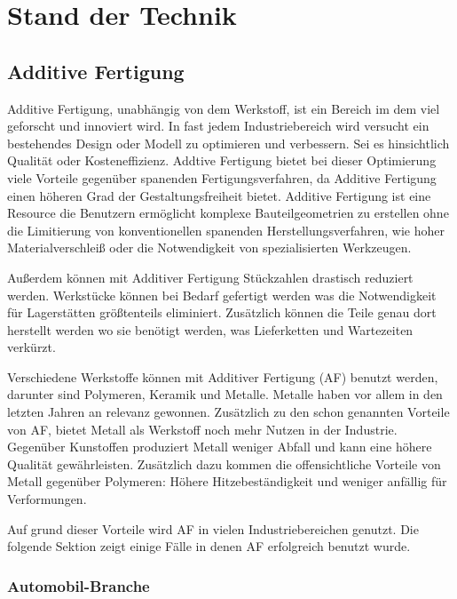 \documentclass[../main.tex]{subfiles}
\begin{document}
\section{Stand der Technik}

\subsection{Additive Fertigung}

Additive Fertigung, unabhängig von dem Werkstoff, ist ein Bereich im dem viel
geforscht und innoviert wird. In fast jedem Industriebereich wird versucht ein
bestehendes Design oder Modell zu optimieren und verbessern. \cite{newMethod}
Sei es hinsichtlich Qualität oder Kosteneffizienz. Addtive Fertigung bietet bei 
dieser Optimierung viele Vorteile gegenüber spanenden Fertigungsverfahren, da 
Additive Fertigung einen höheren Grad der Gestaltungsfreiheit bietet. 
Additive Fertigung ist eine Resource die Benutzern ermöglicht komplexe 
Bauteilgeometrien zu erstellen ohne die Limitierung von konventionellen spanenden 
Herstellungsverfahren, wie hoher Materialverschleiß oder die Notwendigkeit von 
spezialisierten Werkzeugen. \cite{Vafadar.2021} 

Außerdem können mit Additiver Fertigung Stückzahlen drastisch reduziert werden.
Werkstücke können bei Bedarf gefertigt werden was die Notwendigkeit für Lagerstätten
größtenteils eliminiert. Zusätzlich können die Teile genau dort herstellt werden wo 
sie benötigt werden, was Lieferketten und Wartezeiten verkürzt.

Verschiedene Werkstoffe können mit Additiver Fertigung (AF) benutzt werden, darunter
sind Polymeren, Keramik und Metalle. Metalle haben vor allem in den letzten Jahren 
an relevanz gewonnen. Zusätzlich zu den schon genannten Vorteile von AF, 
bietet Metall als Werkstoff noch mehr Nutzen in der Industrie. Gegenüber Kunstoffen
produziert Metall weniger Abfall und kann eine höhere Qualität gewährleisten.
Zusätzlich dazu kommen die offensichtliche Vorteile von Metall gegenüber Polymeren: 
Höhere Hitzebeständigkeit und weniger anfällig für Verformungen.

Auf grund dieser Vorteile wird AF in vielen Industriebereichen genutzt. Die folgende
Sektion zeigt einige Fälle in denen AF erfolgreich benutzt wurde.

\subsubsection*{Automobil-Branche}
\end{document}
